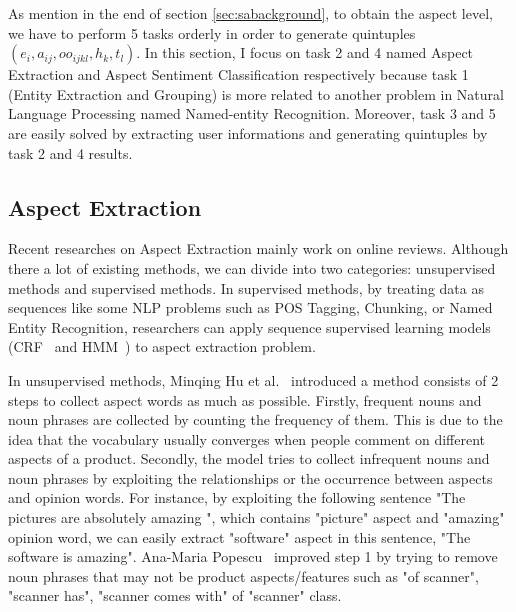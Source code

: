 \documentclass{article}
\begin{document}
As mention in the end of section \ref{sec:sabackground}, to obtain the aspect level, we have to perform 5 tasks orderly in order to generate quintuples $(e_i, a_{ij}, oo_{ijkl}, h_k, t_l)$.
In this section, I focus on task 2 and 4 named Aspect Extraction and Aspect Sentiment Classification respectively because task 1 (Entity Extraction and Grouping) is more related to another problem in Natural Language Processing named Named-entity Recognition.
Moreover, task 3 and 5 are easily solved by extracting user informations and generating quintuples by task 2 and 4 results.

\subsection{Aspect Extraction}
Recent researches on Aspect Extraction mainly work on online reviews. Although there a lot of existing methods, we can divide into two categories: unsupervised methods and supervised methods. 
In supervised methods, by treating data as sequences like some NLP problems such as POS Tagging, Chunking, or Named Entity Recognition, researchers can apply sequence supervised learning models (CRF~\cite{Jakob:2010:EOT:1870658.1870759,Lafferty:2001:CRF:645530.655813} and HMM~\cite{Freitag00informationextraction,Jin:2009:NLH:1553374.1553435,Ding:2008:HLA:1341531.1341561}) to aspect extraction problem.

In unsupervised methods, Minqing Hu et al.~\cite{Hu:2004:MSC:1014052.1014073}  introduced a method consists of 2 steps to collect aspect words as much as possible. 
Firstly, frequent nouns and noun phrases are collected by counting the frequency of them.
This is due to the idea that the vocabulary usually converges when people comment on different aspects of a product.
Secondly, the model tries to collect infrequent nouns and noun phrases by exploiting the relationships or the occurrence between aspects and opinion words.
For instance, by exploiting the following sentence "The pictures are absolutely amazing    ", which contains "picture" aspect and "amazing" opinion word, we can easily extract "software" aspect in this sentence, "The software is amazing".
Ana-Maria Popescu~\cite{Popescu:2005:EPF:1220575.1220618} improved step 1 by trying to remove noun phrases that may not be product aspects/features such as "of scanner", "scanner has", "scanner comes with" of "scanner" class.
\end{document}
